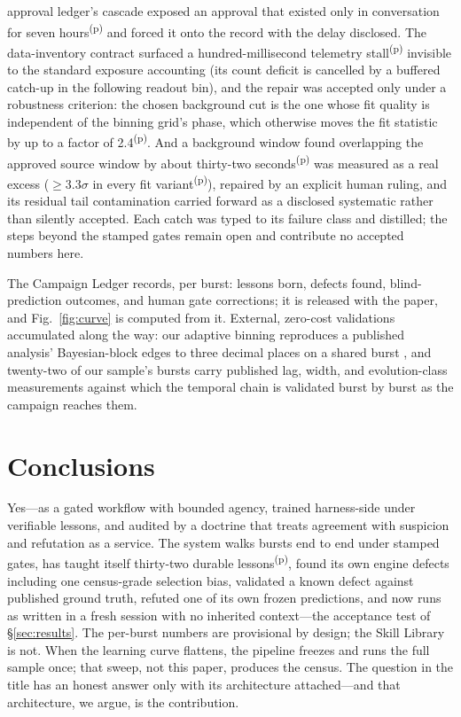\documentclass[twocolumn]{aastex631}
\newcommand{\prov}{\textsuperscript{(p)}}
\begin{document}
approval ledger's cascade exposed an approval that existed only in
conversation for seven hours\prov{} and forced it onto the record with
the delay disclosed. The data-inventory contract surfaced a
hundred-millisecond telemetry stall\prov{} invisible to the standard
exposure accounting (its count deficit is cancelled by a buffered
catch-up in the following readout bin), and the repair was accepted only
under a robustness criterion: the chosen background cut is the one whose
fit quality is independent of the binning grid's phase, which otherwise
moves the fit statistic by up to a factor of 2.4\prov. And a background
window found overlapping the approved source window by about thirty-two
seconds\prov{} was measured as a real excess ($\geq\!3.3\sigma$ in every
fit variant\prov), repaired by an explicit human ruling, and its residual
tail contamination carried forward as a disclosed systematic rather than
silently accepted. Each catch was typed to its failure class and
distilled; the steps beyond the stamped gates remain open and contribute
no accepted numbers here.

The Campaign Ledger records, per burst: lessons born, defects found,
blind-prediction outcomes, and human gate corrections; it is released with
the paper, and Fig.~\ref{fig:curve} is computed from it. External,
zero-cost validations accumulated along the way: our adaptive binning
reproduces a published analysis' Bayesian-block edges to three decimal
places on a shared burst \citep{2021ApJS..253...43L}, and twenty-two of our sample's bursts carry
published lag, width, and evolution-class measurements \citep{2018ApJ...865..153L} against which the
temporal chain is validated burst by burst as the campaign reaches them.



\section{Conclusions} \label{sec:conclusions}
Yes---as a gated workflow with bounded agency, trained harness-side under
verifiable lessons, and audited by a doctrine that treats agreement with
suspicion and refutation as a service. The system walks bursts end to end
under stamped gates, has taught itself thirty-two durable lessons\prov,
found its own engine defects including one census-grade
selection bias, validated a known defect against published ground truth,
refuted one of its own frozen predictions, and now runs as written in a
fresh session with no inherited context---the acceptance test of
\S\ref{sec:results}. The per-burst numbers are provisional by design; the Skill
Library is not. When the learning curve flattens, the pipeline freezes and
runs the full sample once; that sweep, not this paper, produces the census.
The question in the title has an honest answer only with its architecture
attached---and that architecture, we argue, is the contribution.
\end{document}
